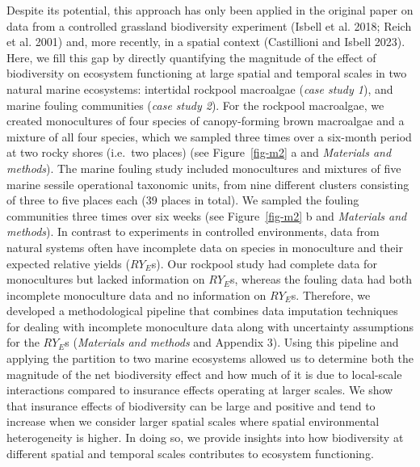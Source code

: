 \documentclass[
  letterpaper,
  DIV=11,
  numbers=noendperiod]{scrartcl}
\begin{document}
Despite its potential, this approach has only been applied in the
original paper on data from a controlled grassland biodiversity
experiment (Isbell et al. 2018; Reich et al. 2001) and, more recently,
in a spatial context (Castillioni and Isbell 2023). Here, we fill this
gap by directly quantifying the magnitude of the effect of biodiversity
on ecosystem functioning at large spatial and temporal scales in two
natural marine ecosystems: intertidal rockpool macroalgae (\emph{case
study 1}), and marine fouling communities (\emph{case study 2}). For the
rockpool macroalgae, we created monocultures of four species of
canopy-forming brown macroalgae and a mixture of all four species, which
we sampled three times over a six-month period at two rocky shores
(i.e.~two places) (see Figure~\ref{fig-m2} a and \emph{Materials and
methods}). The marine fouling study included monocultures and mixtures
of five marine sessile operational taxonomic units, from nine different
clusters consisting of three to five places each (39 places in total).
We sampled the fouling communities three times over six weeks (see
Figure~\ref{fig-m2} b and \emph{Materials and methods}). In contrast to
experiments in controlled environments, data from natural systems often
have incomplete data on species in monoculture and their expected
relative yields (\(RY_{E}\)s). Our rockpool study had complete data for
monocultures but lacked information on \(RY_{E}\)s, whereas the fouling
data had both incomplete monoculture data and no information on
\(RY_{E}\)s. Therefore, we developed a methodological pipeline that
combines data imputation techniques for dealing with incomplete
monoculture data along with uncertainty assumptions for the \(RY_{E}\)s
(\emph{Materials and methods} and Appendix 3). Using this pipeline and
applying the partition to two marine ecosystems allowed us to determine
both the magnitude of the net biodiversity effect and how much of it is
due to local-scale interactions compared to insurance effects operating
at larger scales. We show that insurance effects of biodiversity can be
large and positive and tend to increase when we consider larger spatial
scales where spatial environmental heterogeneity is higher. In doing so,
we provide insights into how biodiversity at different spatial and
temporal scales contributes to ecosystem functioning.
\end{document}
